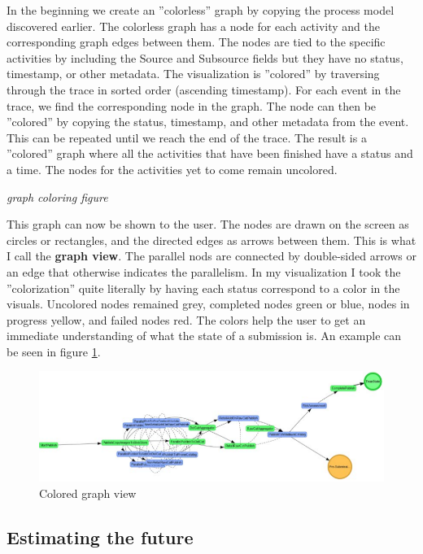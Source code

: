 \documentclass[english,12pt,a4paper,pdftex,sci,utf8]{aaltothesis}
\theoremstyle{definition}
\newcommand{\nyi}[1]{\noindent\colorbox{nyibg}{\textcolor{nyitext}{\emph{#1}}}}
\begin{document}
In the beginning we create an ''colorless'' graph by copying the process model discovered earlier.
The colorless graph has a node for each activity and the corresponding graph edges between them.
The nodes are tied to the specific activities by including the Source and Subsource fields but they have no status, timestamp, or other metadata.
The visualization is ''colored'' by traversing through the trace in sorted order (ascending timestamp).
For each event in the trace, we find the corresponding node in the graph.
The node can then be ''colored'' by copying the status, timestamp, and other metadata from the event.
This can be repeated until we reach the end of the trace.
The result is a ''colored'' graph where all the activities that have been finished have a status and a time.
The nodes for the activities yet to come remain uncolored.

\nyi{graph coloring figure}

This graph can now be shown to the user.
The nodes are drawn on the screen as circles or rectangles, and the directed edges as arrows between them.
This is what I call the \textbf{graph view}.
The parallel nods are connected by double-sided arrows or an edge that otherwise indicates the parallelism.
In my visualization I took the ''colorization'' quite literally by having each status correspond to a color in the visuals. 
Uncolored nodes remained grey, completed nodes green or blue, nodes in progress yellow, and failed nodes red.
The colors help the user to get an immediate understanding of what the state of a submission is.
An example can be seen in figure \ref{fig:coloredgraph}.

\begin{figure}[htb]
    \centering \includegraphics[width=0.9\linewidth]{gfx/graphcolor.png}
    \caption{Colored graph view}
    \label{fig:coloredgraph}
\end{figure}

\subsection{Estimating the future}
\end{document}

